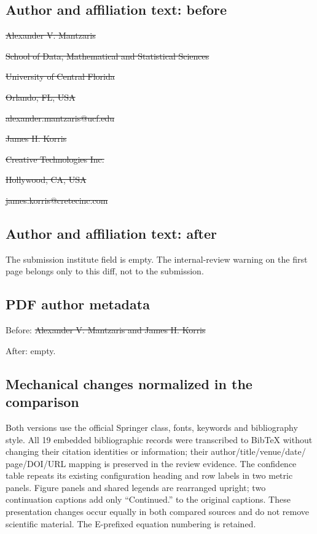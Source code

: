 \documentclass{llncs}
\newcommand{\1}{\mathbf{1}}
\providecommand{\DIFaddtex}[1]{{\protect\color{blue}\uwave{#1}}} %
\providecommand{\DIFdeltex}[1]{{\protect\color{red}\sout{#1}}}                      %
\providecommand{\DIFadd}[1]{\texorpdfstring{\DIFaddtex{#1}}{#1}} %
\providecommand{\DIFdel}[1]{\texorpdfstring{\DIFdeltex{#1}}{}} %
\begin{document}
\subsection*{Author and affiliation text: before}
\noindent\DIFdel{Alexander V. Mantzaris}\par
\noindent\DIFdel{School of Data, Mathematical and Statistical Sciences}\par
\noindent\DIFdel{University of Central Florida}\par
\noindent\DIFdel{Orlando, FL, USA}\par
\noindent\DIFdel{alexander.mantzaris@ucf.edu}\par
\medskip
\noindent\DIFdel{James H. Korris}\par
\noindent\DIFdel{Creative Technologies Inc.}\par
\noindent\DIFdel{Hollywood, CA, USA}\par
\noindent\DIFdel{james.korris@cretecinc.com}\par

\subsection*{Author and affiliation text: after}
\noindent\DIFadd{Anonymous Author(s)}\par
The submission institute field is empty. The internal-review warning on the
first page belongs only to this diff, not to the submission.

\subsection*{PDF author metadata}
Before: \DIFdel{Alexander V. Mantzaris and James H. Korris}\par
After: empty.

\subsection*{Mechanical changes normalized in the comparison}
Both versions use the official Springer class, fonts, keywords and bibliography
style. All 19 embedded bibliographic records were transcribed to BibTeX without
changing their citation identities or information; their author/title/venue/date/
page/DOI/URL mapping is preserved in the review evidence.
The confidence table repeats its existing configuration heading and row labels
in two metric panels. Figure panels and shared legends are rearranged upright;
two continuation captions add only ``Continued.'' to the original captions.
These presentation changes occur equally in both compared sources and do not
remove scientific material. The E-prefixed equation numbering is retained.
\end{document}
